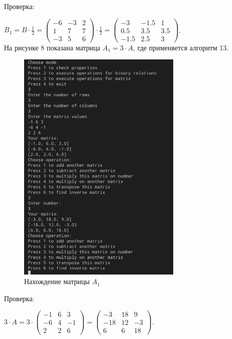 \documentclass[bachelor, och, labwork]{shiza}
\begin{document}
        Проверка:


        $B_1 = B \cdot \frac{1}{2} =
        \begin{pmatrix}
            -6 & -3 & 2  \\
            1 & 7 & 7 \\
            -3 & 5 & 6
        \end{pmatrix} \cdot \frac{1}{2} =
        \begin{pmatrix}
            -3 & -1.5 & 1  \\
            0.5 & 3.5 & 3.5 \\
            -1.5 & 2.5 & 3
        \end{pmatrix}$.\\

        На рисунке 8 показана матрица $A_1 = 3 \cdot A$, где применяется алгоритм 13.

        \begin{figure}[H]
            \centering
            \includegraphics[width=0.7\textwidth]{photo/8.png}
            \caption{Нахождение матрицы $A_1$}
        \end{figure}

        Проверка:

        $3 \cdot A = 3 \cdot
        \begin{pmatrix}
            -1 & 6 & 3  \\
            -6 & 4 & -1 \\
            2 & 2 & 6
        \end{pmatrix} = 
        \begin{pmatrix}
            -3 & 18 & 9  \\
            -18 & 12 & -3 \\
            6 & 6 & 18
        \end{pmatrix}$.\\
\end{document}
